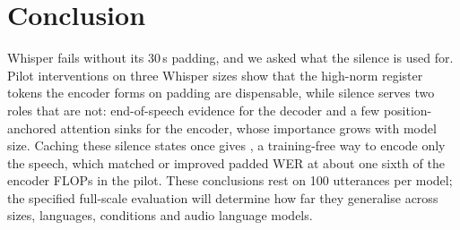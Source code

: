 \section{Conclusion}
\label{sec:conclusion}

Whisper fails without its 30\,s padding, and we asked what the silence is used for. Pilot interventions on three Whisper sizes show that the high-norm register tokens the encoder forms on padding are dispensable, while silence serves two roles that are not: end-of-speech evidence for the decoder and a few position-anchored attention sinks for the encoder, whose importance grows with model size. Caching these silence states once gives \method{}, a training-free way to encode only the speech, which matched or improved padded WER at about one sixth of the encoder FLOPs in the pilot. These conclusions rest on 100 utterances per model; the specified full-scale evaluation will determine how far they generalise across sizes, languages, conditions and audio language models.
